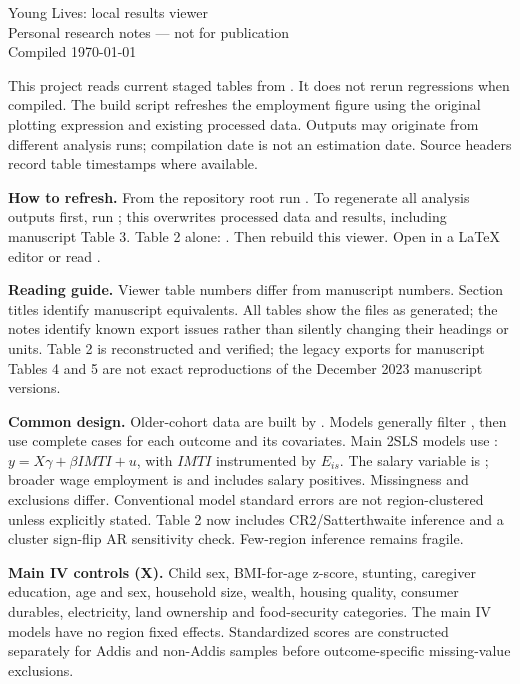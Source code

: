 \documentclass[10pt]{article}
\begin{document}
\begin{center}
{\LARGE Young Lives: local results viewer}\\[6pt]
{\large Personal research notes --- not for publication}\\[4pt]
Compiled \today
\end{center}
This project reads current staged tables from . It does not rerun regressions when compiled. The build script refreshes the employment figure using the original plotting expression and existing processed data. Outputs may originate from different analysis runs; compilation date is not an estimation date. Source headers record table timestamps where available.

\textbf{How to refresh.} From the repository root run . To regenerate all analysis outputs first, run ; this overwrites processed data and results, including manuscript Table 3. Table 2 alone: . Then rebuild this viewer. Open  in a LaTeX editor or read .

\textbf{Reading guide.} Viewer table numbers differ from manuscript numbers. Section titles identify manuscript equivalents. All tables show the files as generated; the notes identify known export issues rather than silently changing their headings or units. Table 2 is reconstructed and verified; the legacy exports for manuscript Tables 4 and 5 are not exact reproductions of the December 2023 manuscript versions.

\textbf{Common design.} Older-cohort data are built by . Models generally filter , then use complete cases for each outcome and its covariates. Main 2SLS models use : $y=X\gamma+\beta IMTI+u$, with $IMTI$ instrumented by $E_{is}$. The salary variable is ; broader wage employment is  and includes salary positives. Missingness and exclusions differ. Conventional model standard errors are not region-clustered unless explicitly stated. Table 2 now includes CR2/Satterthwaite inference and a cluster sign-flip AR sensitivity check. Few-region inference remains fragile.

\textbf{Main IV controls (X).} Child sex, BMI-for-age z-score, stunting, caregiver education, age and sex, household size, wealth, housing quality, consumer durables, electricity, land ownership and food-security categories. The main IV models have no region fixed effects. Standardized scores are constructed separately for Addis and non-Addis samples before outcome-specific missing-value exclusions.
\tableofcontents
\end{document}
